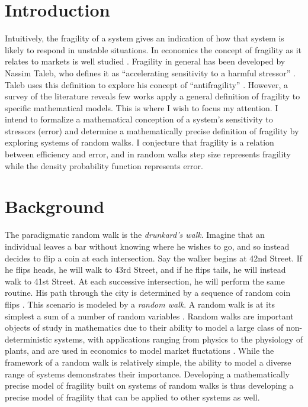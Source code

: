 \documentclass[12pt,letterpaper]{article}
\begin{document}
    \section*{Introduction}
    Intuitively, the fragility of a system gives an indication of how that system is likely to respond
    in unstable situations. In economics the concept of fragility as it relates to markets is well
    studied \cite{anand}. Fragility in general has been developed by Nassim Taleb, who defines it as
    ``accelerating sensitivity to a harmful stressor'' \cite{taleb2}. Taleb uses this definition to
    explore his concept of ``antifragility'' \cite{taleb1}. However, a survey of the literature reveals
    few works apply a general definition of fragility to specific mathematical models. This is where I
    wish to focus my attention. I intend to formalize a mathematical conception of a system's
    sensitivity to stressors (error) and determine a mathematically precise definition of fragility by
    exploring systems of random walks. I conjecture that fragility is a relation between efficiency and
    error, and in random walks step size represents fragility while the density probability function
    represents error.
    
    \section*{Background}
    The paradigmatic random walk is the \emph{drunkard's walk}. Imagine that an individual leaves a bar
    without knowing where he wishes to go, and so instead decides to flip a coin at each intersection.
    Say the walker begins at 42nd Street. If he flips heads, he will walk to 43rd Street, and if he
    flips tails, he will instead walk to 41st Street.  At each successive intersection, he will perform
    the same routine. His path through the city is determined by a sequence of random coin flips
    \cite{weiss}. This scenario is modeled by a \emph{random walk}. A random walk is at its simplest a
    sum of a number of random variables \cite{weiss}. Random walks are important objects of study in
    mathematics due to their ability to model a large class of non-deterministic systems, with
    applications ranging from physics to the physiology of plants, and are used in economics to model
    market fluctations \cite{stochastic, ibe}. While the framework of a random walk is relatively
    simple, the ability to model a diverse range of systems demonstrates their importance. Developing a
    mathematically precise model of fragility built on systems of random walks is thus developing a
    precise model of fragility that can be applied to other systems as well.
    
\end{document}
